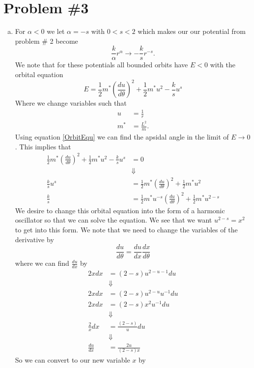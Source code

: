 \documentclass[11pt]{article}
\numberwithin{equation}{section}
\begin{document}
\section{Problem \#3}
\begin{enumerate}[(a)]
\item For $\alpha<0$ we let $\alpha=-s$ with $0<s<2$ which makes our our potential from 
problem \# 2 become
$$\frac{k}{\alpha}r^{\alpha}\rightarrow-\frac{k}{s}r^{-s}.$$
We note that for these potentials all bounded orbits have $E<0$ with the orbital equation
\begin{equation}
E = \frac{1}{2}m^*\left(\frac{du}{d\theta}\right)^2 + \frac{1}{2}m^*u^2 - \frac{k}{s}u^s
\label{OrbitEqu}
\end{equation}
Where we change variables such that
\begin{align*}
u &= \frac{1}{r}\\
m^* &= \frac{L^2}{m}.
\end{align*}
Using equation \ref{OrbitEqu} we can find the apsidal angle in the limit of $E\rightarrow0$.
This implies that
\begin{align*}
\frac{1}{2}m^*\left(\frac{du}{d\theta}\right)^2 + \frac{1}{2}m^*u^2 - \frac{k}{s}u^s &= 0\\
&\Downarrow\\
\frac{k}{s}u^s &= \frac{1}{2}m^*\left(\frac{du}{d\theta}\right)^2 + \frac{1}{2}m^*u^2\\
\frac{k}{s} &= \frac{1}{2}m^*u^{-s}\left(\frac{du}{d\theta}\right)^2 + \frac{1}{2}m^*u^{2-s}
\end{align*}
We desire to change this orbital equation into the form of a harmonic oscillator so that we
can solve the equation. We see that we want $u^{2-s} = x^2$ to get into this form. We note 
that we need to change the variables of the derivative by
$$\frac{du}{d\theta} = \frac{du}{dx}\frac{dx}{d\theta}$$
where we can find $\frac{du}{dx}$ by
\begin{align*}
2xdx &= (2-s)u^{2-u-1}du\\
&\Downarrow\\
2xdx &= (2-s)u^{2-u}u^{-1}du\\
2xdx &= (2-s)x^2u^{-1}du\\
&\Downarrow\\
\frac{2}{x}dx &= \frac{(2-s)}{u}du\\
&\Downarrow\\
\frac{du}{dx} &= \frac{2u}{(2-s)x}
\end{align*}
So we can convert to our new variable $x$ by
\begin{align*}

\end{align*}
\end{enumerate}
\end{document}
